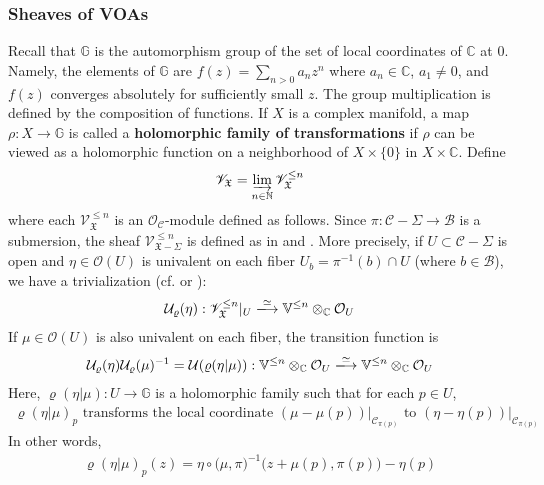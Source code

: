 \documentclass[11pt,b5paper,notitlepage]{article}
\theoremstyle{definition}
\theoremstyle{plain}
\newcommand{\fk}{\mathfrak}
\newcommand{\mc}{\mathcal}
\newcommand{\scr}{\mathscr}
\newcommand{\Vbb}{\mathbb V}
\newcommand{\Gbb}{\mathbb G}
\newcommand{\Cbb}{\mathbb C}
\newcommand{\Nbb}{\mathbb N}
\newcommand{\<}{\left\langle}
\renewcommand{\>}{\right\rangle}
\newcommand{\MC}{\mathcal{C}}
\newcommand{\MB}{\mathcal{B}}
\newcommand{\fx}{\mathfrak{X}}
\numberwithin{equation}{section}
\begin{document}
\subsubsection{Sheaves of VOAs}\label{mc2}
Recall that $\Gbb$ is the automorphism group of the set of local coordinates of $\Cbb$ at $0$. Namely, the elements of $\Gbb$ are $f(z)=\sum_{n>0}a_nz^n$ where $a_n\in\Cbb$, $a_1\neq0$, and $f(z)$ converges absolutely for sufficiently small $z$. The group multiplication is defined by the composition of functions. If $X$ is a complex manifold, a map $\rho:X\rightarrow\Gbb$ is called a \textbf{holomorphic family of transformations} if $\rho$ can be viewed as a holomorphic function on a neighborhood of $X\times\{0\}$ in $X\times\Cbb$.  Define
\begin{align*}
\scr V_{\fk X}=\varinjlim_{n\in\Nbb}\scr V_{\fk X}^{\leq n}
\end{align*}
where each $\scr V_{\fk X}^{\leq n}$ is an $\mc O_{\mc C}$-module  defined as follows. Since $\pi:\mc C-\Sigma\rightarrow\mc B$ is a submersion, the sheaf $\scr V_{\fk X-\Sigma}^{\leq n}$ is defined as in \cite[Sec. 5]{Gui-sewingconvergence} and \cite[Sec. 1.6]{GZ1}. %
More precisely, if $U\subset\MC-\Sigma$ is open and $\eta\in\mc O(U)$ is univalent on each fiber $U_b=\pi^{-1}(b)\cap U$ (where $b\in\MB$), we have a trivialization (cf. \cite[Eq. (2.5)]{Gui-sewingconvergence} or \cite[Sec. 1.6]{GZ1}):
\begin{gather}\label{eq175}
\mc U_\varrho(\eta):\scr V^{\leq n}_\fx|_U\xlongrightarrow{\simeq}\Vbb^{\leq n}\otimes_\Cbb\mc O_U
\end{gather}
If $\mu\in\mc O(U)$ is also univalent on each fiber, the transition function is
\begin{align}\label{eqb22}
\mc U_\varrho(\eta)\mc U_\varrho(\mu)^{-1}=\mc U(\varrho(\eta|\mu)):\Vbb^{\leq n}\otimes_\Cbb\mc O_U\xlongrightarrow{\simeq}\Vbb^{\leq n}\otimes_\Cbb\mc O_U
\end{align}
Here, $\varrho(\eta|\mu):U\rightarrow\Gbb$ is a holomorphic family such that for each $p\in U$,  
\begin{align}\label{eqb39}
\text{$\varrho(\eta|\mu)_p$ transforms the local coordinate $(\mu-\mu(p))|_{\mc C_{\pi(p)}}$ to $(\eta-\eta(p))|_{\mc C_{\pi(p)}}$}
\end{align}
In other words,
\begin{align}\label{eqb40}
\varrho(\eta|\mu)_p(z)=\eta\circ\big(\mu,\pi)^{-1}(z+\mu(p),\pi(p)\big)-\eta(p)
\end{align}
\end{document}
